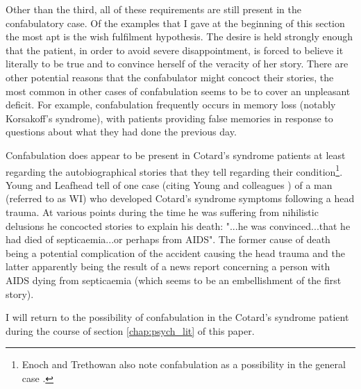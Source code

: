 Other than the third, all of these requirements are still present in the confabulatory case. Of the examples that I gave at the beginning of this section the most apt is the wish fulfilment hypothesis. The desire is held strongly enough that the patient, in order to avoid severe disappointment, is forced to believe it literally to be true and to convince herself of the veracity of her story. There are other potential reasons that the confabulator might concoct their stories, the most common in other cases of confabulation seems to be to cover an unpleasant deficit. For example, confabulation frequently occurs in memory loss (notably Korsakoff's syndrome), with patients providing false memories in response to questions about what they had done the previous day.

Confabulation does appear to be present in Cotard's syndrome patients at least regarding the autobiographical stories that they tell regarding their condition\footnote{Enoch and Trethowan also note confabulation as a possibility in the general case \cite[p. 177]{enoch1991}.}. Young and Leafhead tell of one case (citing Young and colleagues \cite{young1992}) of a man (referred to as WI) who developed Cotard's syndrome symptoms following a head trauma. At various points during the time he was suffering from nihilistic delusions he concocted stories to explain his death: "...he was convinced...that he had died of septicaemia...or perhaps from AIDS". The former cause of death being a potential complication of the accident causing the head trauma and the latter apparently being the result of a news report concerning a person with AIDS dying from septicaemia (which seems to be an embellishment of the first story).

I will return to the possibility of confabulation in the Cotard's syndrome patient during the course of section \ref{chap:psych_lit} of this paper.